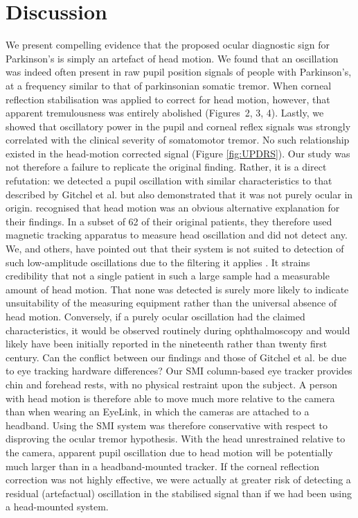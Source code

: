\documentclass[jou,a4paper]{apa6}
\begin{document}
\section{Discussion}
We present compelling evidence that the proposed ocular diagnostic sign for Parkinson's \cite{Gitchel2012Pervasive-ocula} is simply an artefact of head motion. We found that an oscillation was indeed often present in raw pupil position signals of people with Parkinson's, at a frequency similar to that of parkinsonian somatic tremor. When corneal reflection stabilisation was applied to correct for head motion, however, that apparent tremulousness was entirely abolished (Figures 2, 3, 4). Lastly, we showed that oscillatory power in the pupil and corneal reflex signals was strongly correlated with the clinical severity of somatomotor tremor. No such relationship existed in the head-motion corrected signal (Figure \ref{fig:UPDRS}). Our study was not therefore a failure to replicate the original finding. Rather, it is a direct refutation: we detected a pupil oscillation with similar characteristics to that described by Gitchel et al. but also demonstrated that it was not purely ocular in origin.
\citet{Gitchel2012Pervasive-ocula} recognised that head motion was an obvious alternative explanation for their findings. In a subset of 62 of their original patients, they therefore used magnetic tracking apparatus to measure head oscillation and did not detect any. We, and others, have pointed out that their system is not suited to detection of such low-amplitude oscillations due to the filtering it applies \citep{MacAskill2013Ocular-Tremor-i,Saifee2014Tremor-of-the-e}. It strains credibility that not a single patient in such a large sample had a measurable amount of head motion. That none was detected is surely more likely to indicate unsuitability of the measuring equipment rather than the universal absence of head motion. Conversely, if a purely ocular oscillation had the claimed characteristics, it would be observed routinely during ophthalmoscopy \citep{Leigh2013Tremor-of-the-e,Saifee2014Tremor-of-the-e} and would likely have been initially reported in the nineteenth rather than twenty first century.
Can the conflict between our findings and those of Gitchel et al. be due to eye tracking hardware differences? Our SMI column-based eye tracker provides chin and forehead rests, with no physical restraint upon the subject. A person with head motion is therefore able to move much more relative to the camera than when wearing an EyeLink, in which the cameras are attached to a headband. Using the SMI system was therefore conservative with respect to disproving the ocular tremor hypothesis. With the head unrestrained relative to the camera, apparent pupil oscillation due to head motion will be potentially much larger than in a headband-mounted tracker. If the corneal reflection correction was not highly effective, we were actually at greater risk of detecting a residual (artefactual) oscillation in the stabilised signal than if we had been using a head-mounted system. 
\end{document}
